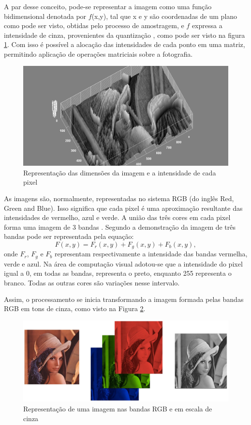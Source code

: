 \documentclass[a4paper,alpha-refs]{RBCA_v1.0}
\begin{document}
A par desse conceito, pode-se representar a imagem como uma função bidimensional denotada por $f$(x,y), tal que x e y são coordenadas de um plano como pode ser visto, obtidas pelo processo de amostragem, e $f$ expressa a intensidade de cinza, provenientes da quantização \citep{ProcDigital}, como pode ser visto na figura \ref{img:lena3d}. Com isso é possível a alocação das intensidades de cada ponto em uma matriz, permitindo aplicação de operações matriciais sobre a fotografia. 

\begin{figure}[h!]
	\centering
	\includegraphics[width=.45\textwidth]{img/img1.png}
	\caption{Representação das dimensões da imagem e a intensidade de cada pixel}
	\label{img:lena3d}
\end{figure}

As imagens são, normalmente, representadas no sistema RGB (do inglês Red, Green and Blue). Isso significa que cada pixel é uma aproximação resultante das intensidades de vermelho, azul e verde. A união das três cores em cada pixel forma uma imagem de 3 bandas \citep{biasi2002desenvolvimento}. Segundo \cite{de2006introduccao} a demonstração da imagem de três bandas pode ser representada pela equação:
\begin{equation}
F(x,y)=F_r(x,y)+F_g(x,y)+F_b(x,y),
\end{equation}
onde $F_r$, $F_g$ e $F_b$ representam respectivamente a intensidade das bandas vermelha, verde e azul. Na área de computação visual adotou-se que a intensidade do pixel igual a 0, em todas as bandas, representa o preto, enquanto 255 representa o branco. Todas as outras cores são variações nesse intervalo. 

Assim, o processamento se inicia transformando a imagem formada pelas bandas RGB em tons de cinza, como visto na Figura \ref{img:lenargb}. 
\begin{figure}[h!]
	\centering
	\includegraphics[width=.5\textwidth]{img/lenna_rgb_gray.jpg}
	\caption{Representação de uma imagem nas bandas RGB e em escala de cinza}
	\label{img:lenargb}
\end{figure}
\end{document}
